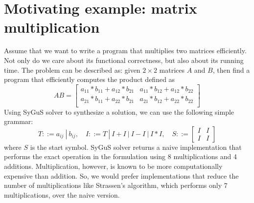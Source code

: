\section{Motivating example: matrix multiplication}
\label{sec:example}

Assume that we want to write a program that multiplies two matrices efficiently. 
%
Not only do we care about its functional correctness, but also about its running time.
%
The problem can be described as: given $2 \times 2$ matrices $A$ and $B$, then find a program that efficiently computes the product defined as
%
\begin{equation}
    AB =
\begin{bmatrix}
a_{11} * b_{11} + a_{12} * b_{21} &
a_{11} * b_{12} + a_{12} * b_{22} \\
a_{21} * b_{11} + a_{22} * b_{21} &
a_{21} * b_{12} + a_{22} * b_{22} \\
\end{bmatrix}
\label{eqn:matrix-mul}
\end{equation}
%
%
Using SyGuS solver to synthesize a solution, we can use the following simple grammar:
%
\[
T ::= a_{ij} \ | \ b_{ij}, \quad
I ::= T \ | \ I + I \ | \ I - I \ | \ I * I, \quad
S ::=
\begin{bmatrix} I & I \\
I & I
\end{bmatrix}
\]
%
where $S$ is the start symbol. 
%
SyGuS solver returns a naive implementation that performs the exact operation in the formulation using 8 multiplications and 4 additions.
%
Multiplication, however, is known to be more computationally expensive than addition.
%
So, we would prefer implementations that reduce the number of multiplications like Strassen's algorithm, which performs only 7 multiplications, over the naive version.
%

